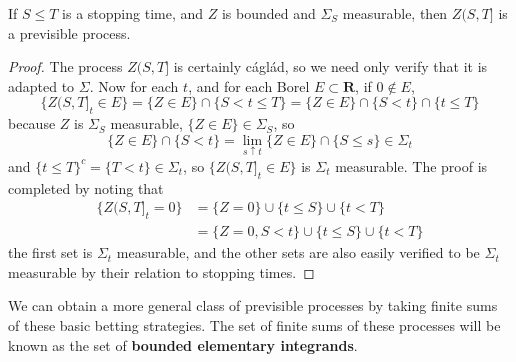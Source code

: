 \begin{lemma}
    If $S \leq T$ is a stopping time, and $Z$ is bounded and $\Sigma_S$ measurable, then $Z(S,T]$ is a previsible process.
\end{lemma}
\begin{proof}
    The process $Z(S,T]$ is certainly c\'{a}gl\'{a}d, so we need only verify that it is adapted to $\Sigma$. Now for each $t$, and for each Borel $E \subset \mathbf{R}$, if $0 \not \in E$,
    \[ \{ Z(S,T]_t \in E \} = \{ Z \in E \} \cap \{ S < t \leq T \} = \{ Z \in E \} \cap \{ S < t \} \cap \{ t \leq T \} \]
    because $Z$ is $\Sigma_S$ measurable, $\{ Z \in E \} \in \Sigma_S$, so
    \[ \{ Z \in E \} \cap \{ S < t \} = \lim_{s \uparrow t} \{ Z \in E \} \cap \{ S \leq s \} \in \Sigma_t \]
    and $\{ t \leq T \}^c = \{ T < t \} \in \Sigma_t$, so $\{ Z(S,T]_t \in E \}$ is $\Sigma_t$ measurable. The proof is completed by noting that
    \begin{align*}
        \{ Z(S,T]_t = 0 \} &= \{ Z = 0 \} \cup \{ t \leq S \} \cup \{ t < T \}\\
        &= \{ Z = 0, S < t \} \cup \{ t \leq S \} \cup \{ t < T \}
    \end{align*}
    the first set is $\Sigma_t$ measurable, and the other sets are also easily verified to be $\Sigma_t$ measurable by their relation to stopping times.
\end{proof}

We can obtain a more general class of previsible processes by taking finite sums of these basic betting strategies. The set of finite sums of these processes will be known as the set of {\bf bounded elementary integrands}.

